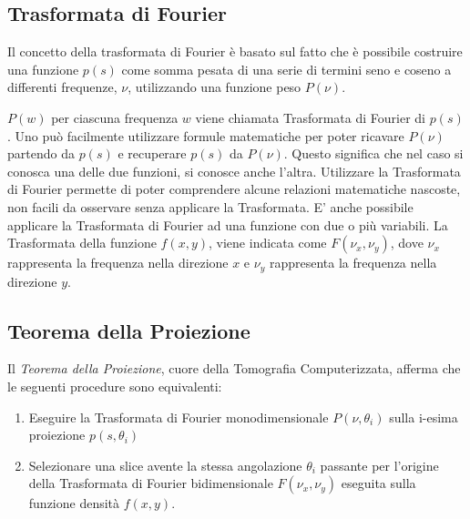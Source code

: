 \documentclass[a4paper,12pt, doubleside]{report}
\begin{document}
                \bigskip
                               
            \subsection{Trasformata di Fourier}
                \par
                    Il concetto della trasformata di Fourier è basato sul fatto che è possibile costruire una funzione $p(s)$ come somma pesata di una serie di termini seno e coseno a differenti frequenze, $\nu$, utilizzando una funzione peso $P(\nu)$.
                    
                \bigskip
                \par
                    $P(w)$ per ciascuna frequenza $w$ viene chiamata Trasformata di Fourier di $p(s)$. Uno può facilmente utilizzare formule matematiche per poter ricavare $P(\nu)$ partendo da $p(s)$ e recuperare $p(s)$ da $P(\nu)$. Questo significa che nel caso si conosca una delle due funzioni, si conosce anche l'altra. Utilizzare la Trasformata di Fourier permette di poter comprendere alcune relazioni matematiche nascoste, non facili da osservare senza applicare la Trasformata. E' anche possibile applicare la Trasformata di Fourier ad una funzione con due o più variabili. La Trasformata della funzione $f(x,y)$, viene indicata come $F(\nu_x,\nu_y)$, dove $\nu_x$ rappresenta la frequenza nella direzione $x$ e $\nu_y$ rappresenta la frequenza nella direzione $y$.
                    
            \subsection{Teorema della Proiezione}
                
                \par
                    Il \textit{Teorema della Proiezione}, cuore della Tomografia Computerizzata, afferma che le seguenti procedure sono equivalenti:
        
                    \begin{enumerate}
                        \item Eseguire la Trasformata di Fourier monodimensionale $P(\nu,\theta_i)$ sulla i-esima proiezione $p(s,\theta_i)$
                        \item Selezionare una slice avente la stessa angolazione $\theta_i$ passante per l'origine della Trasformata di Fourier bidimensionale $F(\nu_x,\nu_y)$ eseguita sulla funzione densità $f(x,y)$.  
                    \end{enumerate}
                
\end{document}
